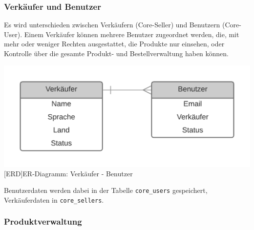 	
	\subsubsection{Verkäufer und Benutzer}
	
	Es wird unterschieden zwischen Verkäufern (Core-Seller) und Benutzern (Core-User). Einem Verkäufer können mehrere Benutzer zugeordnet werden, die, mit mehr oder weniger Rechten ausgestattet, die Produkte nur einsehen, oder Kontrolle über die gesamte Produkt- und Bestellverwaltung haben können.\\
	\begin{minipage}{\linewidth}
		\vspace{1em}
		\centering
		\includegraphics[width=0.6\linewidth]{img/ERD_Seller_User_complete}
		[ERD]{ER-Diagramm: Verkäufer - Benutzer}
		\label{fig:header}
		\vspace{1em}
	\end{minipage}
	
	Benutzerdaten werden dabei in der Tabelle \texttt{core\_users} gespeichert, Verkäuferdaten in \texttt{core\_sellers}.

	 
	
	\subsubsection{Produktverwaltung}
	
